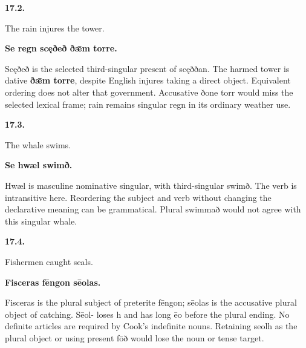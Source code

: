 \par\begin{minipage}{\linewidth}\raggedright
\textbf{17.2.}

The rain injures the tower.

\textbf{Se regn scęðeð ðǣm torre.}

Scęðeð is the selected third-singular present of scęððan. The harmed tower is dative \textbf{ðǣm torre}, despite English injures taking a direct object. Equivalent ordering does not alter that government. Accusative ðone torr would miss the selected lexical frame; rain remains singular regn in its ordinary weather use.

\end{minipage}\par\addvspace{4pt}

\par\begin{minipage}{\linewidth}\raggedright
\textbf{17.3.}

The whale swims.

\textbf{Se hwæl swimð.}

Hwæl is masculine nominative singular, with third-singular swimð. The verb is intransitive here. Reordering the subject and verb without changing the declarative meaning can be grammatical. Plural swimmað would not agree with this singular whale.

\end{minipage}\par\addvspace{4pt}

\par\begin{minipage}{\linewidth}\raggedright
\textbf{17.4.}

Fishermen caught seals.

\textbf{Fisceras fēngon sēolas.}

Fisceras is the plural subject of preterite fēngon; sēolas is the accusative plural object of catching. Sēol- loses h and has long ēo before the plural ending. No definite articles are required by Cook's indefinite nouns. Retaining seolh as the plural object or using present fōð would lose the noun or tense target.

\end{minipage}\par\addvspace{4pt}

